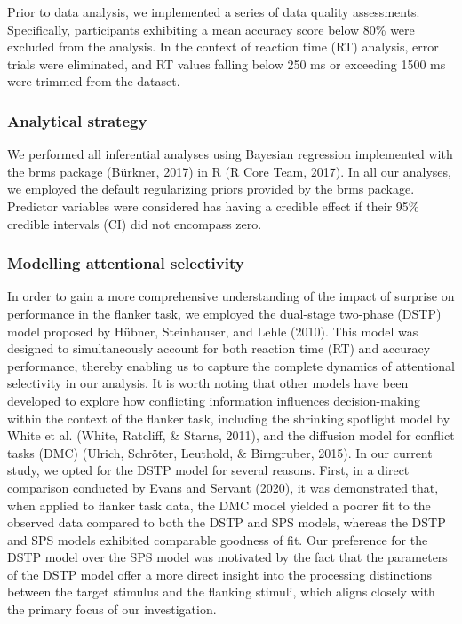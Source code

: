 \documentclass[
  man]{apa7}
\begin{document}
Prior to data analysis, we implemented a series of data quality assessments. Specifically, participants exhibiting a mean accuracy score below 80\% were excluded from the analysis. In the context of reaction time (RT) analysis, error trials were eliminated, and RT values falling below 250 ms or exceeding 1500 ms were trimmed from the dataset.

\hypertarget{analytical-strategy}{%
\subsubsection{Analytical strategy}\label{analytical-strategy}}

We performed all inferential analyses using Bayesian regression implemented with the brms package (Bürkner, 2017) in R (R Core Team, 2017). In all our analyses, we employed the default regularizing priors provided by the brms package. Predictor variables were considered has having a credible effect if their 95\% credible intervals (CI) did not encompass zero.

\hypertarget{modelling-attentional-selectivity}{%
\subsubsection{Modelling attentional selectivity}\label{modelling-attentional-selectivity}}

In order to gain a more comprehensive understanding of the impact of surprise on performance in the flanker task, we employed the dual-stage two-phase (DSTP) model proposed by Hübner, Steinhauser, and Lehle (2010). This model was designed to simultaneously account for both reaction time (RT) and accuracy performance, thereby enabling us to capture the complete dynamics of attentional selectivity in our analysis. It is worth noting that other models have been developed to explore how conflicting information influences decision-making within the context of the flanker task, including the shrinking spotlight model by White et al. (White, Ratcliff, \& Starns, 2011), and the diffusion model for conflict tasks (DMC) (Ulrich, Schröter, Leuthold, \& Birngruber, 2015). In our current study, we opted for the DSTP model for several reasons. First, in a direct comparison conducted by Evans and Servant (2020), it was demonstrated that, when applied to flanker task data, the DMC model yielded a poorer fit to the observed data compared to both the DSTP and SPS models, whereas the DSTP and SPS models exhibited comparable goodness of fit. Our preference for the DSTP model over the SPS model was motivated by the fact that the parameters of the DSTP model offer a more direct insight into the processing distinctions between the target stimulus and the flanking stimuli, which aligns closely with the primary focus of our investigation.
\end{document}
